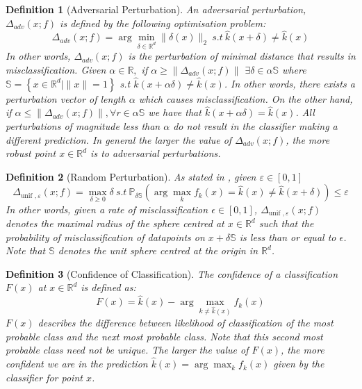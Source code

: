 \documentclass[a4paper,singlecolumn,12pt]{article}
\newtheorem{definition}{Definition}[subsection]
\begin{document}
\begin{definition}[Adversarial Perturbation]

An adversarial perturbation, $\Delta_{adv}(x;f)$ is defined by the following optimisation problem:
$$\Delta_{adv}(x;f) = \arg \min _{\delta \in \mathbb{R}^{d}} \|\delta(x)\|_{2} \ s.t \ \hat{k}(x + \delta) \neq \hat{k}(x) $$
In other words, $\Delta_{adv}(x;f)$ is the perturbation of minimal distance that results in misclassification. Given $\alpha \in \mathbb{R},$ if $\alpha \geqslant\left\|\Delta_{adv}(x;f)\right\|$
$\exists \delta \in \alpha\mathbb{S}$ where $\mathbb{S}=\left\{x \in \mathbb{R}^{d} \mid\|x\|=1\right\} $ s.t $ \hat{k}(x+\alpha \delta) \neq \hat{k}(x)$. In other words, there exists a perturbation vector of length $\alpha$ which causes misclassification. On the other hand, if $ \alpha \leq\left\|\Delta_{adv}(x;f)\right\|,  \forall r \in \alpha\mathbb{S} $ we have that $ \hat{k}(x+\alpha \delta)=\hat{k}(x)$. All perturbations of magnitude less than $\alpha $ do not result in the classifier making a different prediction. In general the larger the value of $\Delta_{adv}(x;f)$, the more robust point $x \in \mathbb{R}^{d}$ is to adversarial perturbations.

\end{definition}
\begin{definition}[Random Perturbation]
As stated in \cite{fawzi2016analysis}, given $\varepsilon \in [0, 1]$
$$\Delta_{\text {unif }, \varepsilon}(x ; f)=\max_{\delta \geq 0} \delta \ s.t \ \mathbb{P}_{\delta\mathbb{S}} \left(\arg \max _{k} f_{k}(x)=\hat{k}(x) \neq \hat{k}(x+\delta)\right) \leqslant \varepsilon$$ In other words, given a rate of misclassification $\epsilon \in [0, 1]$,   $\Delta_{\text {unif }, \varepsilon}(x ; f)$ denotes the maximal radius of the sphere centred at $x\in\mathbb{R}^{d}$ such that the probability of misclassification of datapoints on $x + \delta\mathbb{S}$ is less than or equal to $\epsilon$. Note that $\mathbb{S}$ denotes the unit sphere centred at the origin in $\mathbb{R}^d$. 
\end{definition}

\begin{definition}[Confidence of Classification]
The confidence of a classification $F(x)$ at $x \in \mathbb{R}^{d}$ is defined as:
$$F(x)=\hat{k}(x)-\arg \max _{k \neq \hat{k}(x)} f_{k}(x)$$
$F(x)$ describes the difference between likelihood of classification of the most probable class and the next most probable class. Note that this second most probable class need not be unique. The larger the value of $F(x)$, the more confident we are in the prediction $\hat{k}(x) = \arg \max_{k} f_{k}(x) $ given by the classifier for point $x$.
\end{definition}
\end{document}
